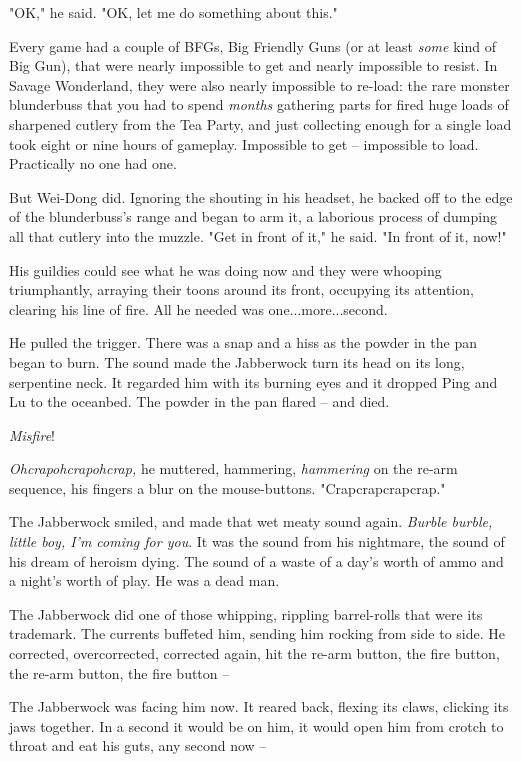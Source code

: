 "OK," he said. "OK, let me do something about this."

Every game had a couple of BFGs, Big Friendly Guns (or at least
\emph{some} kind of Big Gun), that were nearly impossible to get
and nearly impossible to resist. In Savage Wonderland, they were
also nearly impossible to re-load: the rare monster blunderbuss
that you had to spend \emph{months} gathering parts for fired huge
loads of sharpened cutlery from the Tea Party, and just collecting
enough for a single load took eight or nine hours of gameplay.
Impossible to get -- impossible to load. Practically no one had
one.

But Wei-Dong did. Ignoring the shouting in his headset, he backed
off to the edge of the blunderbuss's range and began to arm it, a
laborious process of dumping all that cutlery into the muzzle. "Get
in front of it," he said. "In front of it, now!"

His guildies could see what he was doing now and they were whooping
triumphantly, arraying their toons around its front, occupying its
attention, clearing his line of fire. All he needed was
one...more...second.

He pulled the trigger. There was a snap and a hiss as the powder in
the pan began to burn. The sound made the Jabberwock turn its head
on its long, serpentine neck. It regarded him with its burning eyes
and it dropped Ping and Lu to the oceanbed. The powder in the pan
flared -- and died.

\emph{Misfire}!

\emph{Ohcrapohcrapohcrap,} he muttered, hammering, \emph{hammering}
on the re-arm sequence, his fingers a blur on the mouse-buttons.
"Crapcrapcrapcrap."

The Jabberwock smiled, and made that wet meaty sound again.
\emph{Burble burble, little boy, I'm coming for you}. It was the
sound from his nightmare, the sound of his dream of heroism dying.
The sound of a waste of a day's worth of ammo and a night's worth
of play. He was a dead man.

The Jabberwock did one of those whipping, rippling barrel-rolls
that were its trademark. The currents buffeted him, sending him
rocking from side to side. He corrected, overcorrected, corrected
again, hit the re-arm button, the fire button, the re-arm button,
the fire button --

The Jabberwock was facing him now. It reared back, flexing its
claws, clicking its jaws together. In a second it would be on him,
it would open him from crotch to throat and eat his guts, any
second now --

